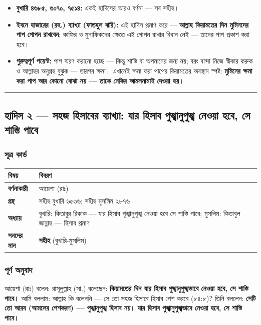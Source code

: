 \begin{itemize}
\item \textbf{বুখারি ৪৬৮৫, ৬০৭০, ৭৫১৪:} একই হাদিসের আরও বর্ণনা — সব সহীহ।
\item \textbf{ইবনে হাজারের (রহ.) ব্যাখ্যা (ফাতহুল বারি):} এই হাদিস প্রমাণ করে — \textbf{আল্লাহ কিয়ামতের দিন মুমিনদের পাপ গোপন রাখবেন}; কাফির ও মুনাফিকদের ক্ষেত্রে এই গোপন রাখার বিধান নেই — তাদের পাপ প্রকাশ করা হবে।
\item \textbf{গুরুত্বপূর্ণ পয়েন্ট:} পাপ স্মরণ করানো হচ্ছে — কিন্তু শাস্তি বা অপমানের জন্য নয়; বরং বান্দা নিজে স্বীকার করুক ও আল্লাহর অনুগ্রহ বুঝুক — তারপর ক্ষমা। এখানেই ক্ষমা করা পাপের কিয়ামতের অবস্থান স্পষ্ট: \textbf{মুমিনের ক্ষমা করা পাপ আর কোনো বোঝা নয় — তাকে নেকির আমলনামাই দেওয়া হয়।}
\end{itemize}
\medskip\hrule\medskip

\subsection*{হাদিস ২ — সহজ হিসাবের ব্যাখ্যা: যার হিসাব পুঙ্খানুপুঙ্খ নেওয়া হবে, সে শাস্তি পাবে}

\subsubsection*{সূত্র কার্ড}

\begin{table}[h]\centering\small
\begin{tabular}{ll}
বিষয় & বিবরণ \\
\hline
\textbf{বর্ণনাকারী} & আয়েশা (রাঃ) \\
\textbf{গ্রন্থ} & সহীহ বুখারি ৬৫৩৬; সহীহ মুসলিম ২৮৭৬ \\
\textbf{অধ্যায়} & বুখারি: কিতাবুর রিকাক — \lat{“}যার হিসাব পুঙ্খানুপুঙ্খ নেওয়া হবে সে শাস্তি পাবে\lat{”}; মুসলিম: কিতাবুল জান্নাহ — \lat{“}হিসাব প্রমাণ\lat{”} \\
\textbf{সনদের মান} & \textbf{সহীহ} (বুখারি-মুসলিম) \\
\hline
\end{tabular}
\end{table}

\subsubsection*{পূর্ণ অনুবাদ}

আয়েশা (রাঃ) বলেন: রাসূলুল্লাহ (সা.) বলেছেন: \textbf{কিয়ামতের দিন যার হিসাব পুঙ্খানুপুঙ্খভাবে নেওয়া হবে, সে শাস্তি পাবে।} আমি বললাম: আল্লাহ কি বলেননি — সে তো সহজ হিসাবে হিসাব পেশ করবে (৮৪:৮)? তিনি বললেন: \textbf{সেটি তো আরয (আমলের পেশকরণ) — পুঙ্খানুপুঙ্খ হিসাব নয়। যার হিসাব পুঙ্খানুপুঙ্খভাবে নেওয়া হবে, সে শাস্তি পাবে।}

